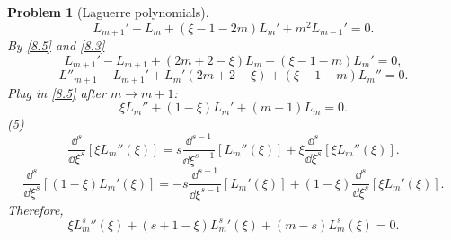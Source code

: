 \documentclass{article}
\theoremstyle{1}
\newtheorem{problem}{Problem}
\begin{document}
\begin{problem}[Laguerre polynomials]
\begin{equation}
        L_{m+1}'+L_m+(\xi -1-2m)L_m'+m^2L_{m-1}'=0.
    \end{equation}
    By \eqref{8.5} and \eqref{8.3}
    \begin{equation}
        L_{m+1}'-L_{m+1}+(2m+2-\xi)L_m+(\xi -1-m)L_m'=0,
    \end{equation}
    \begin{equation}
        L''_{m+1}-L_{m+1}'+L_m'(2m+2-\xi)+(\xi-1-m)L_m''=0.
    \end{equation}
    Plug in \eqref{8.5} after $m\rightarrow m+1$:
    \begin{equation}
        \xi L_m''+(1-\xi)L_m'+(m+1)L_m=0.
    \end{equation}
    (5) 
    \begin{equation}
        \frac{\dd^s}{\dd{\xi}^s}\left[\xi L_m''(\xi)\right]=s\frac{\dd^{s-1}}{\dd{\xi}^{s-1}}\left[L_m''(\xi)\right]+\xi\frac{\dd^s}{\dd{\xi}^s}\left[\xi L_m''(\xi)\right].
    \end{equation}
    \begin{equation}
        \frac{\dd^s}{\dd{\xi}^s}\left[(1-\xi) L_m'(\xi)\right]=-s\frac{\dd^{s-1}}{\dd{\xi}^{s-1}}\left[L_m'(\xi)\right]+(1-\xi)\frac{\dd^s}{\dd{\xi}^s}\left[\xi L_m'(\xi)\right].
    \end{equation}
    Therefore,
    \begin{equation}
        \xi {L_m^s}''(\xi)+\left(s+1-\xi\right){L_m^s}'(\xi)+\left(m-s\right) L_m^s(\xi)=0.
    \end{equation}



\end{problem}
\end{document}
